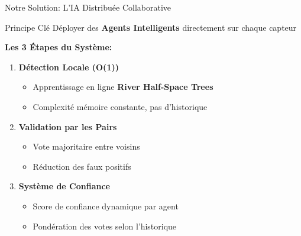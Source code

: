 \documentclass[aspectratio=169]{beamer}
\begin{document}
\begin{frame}{Notre Solution: L'IA Distribuée Collaborative}
    \begin{block}{Principe Clé}
        Déployer des \textbf{Agents Intelligents} directement sur chaque capteur
    \end{block}
    
    \vspace{0.3cm}
    
    \textbf{Les 3 Étapes du Système:}
    
    \begin{enumerate}
        \item \textbf{Détection Locale (O(1))}
        \begin{itemize}
            \item Apprentissage en ligne \textbf{River Half-Space Trees}
            \item Complexité mémoire constante, pas d'historique
        \end{itemize}
        
        \vspace{0.2cm}
        
        \item \textbf{Validation par les Pairs}
        \begin{itemize}
            \item Vote majoritaire entre voisins
            \item Réduction des faux positifs 
        \end{itemize}
        
        \vspace{0.2cm}
        
        \item \textbf{Système de Confiance}
        \begin{itemize}
            \item Score de confiance dynamique par agent
            \item Pondération des votes selon l'historique
        \end{itemize}
    \end{enumerate}
\end{frame}
\end{document}
